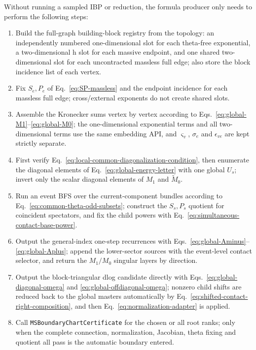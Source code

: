 \documentclass[11pt,a4paper]{article}
\begin{document}
Without running a sampled IBP or reduction, the formula producer only needs to perform the following steps:
\begin{enumerate}[label=\arabic*.]
  \item Build the full-graph building-block registry from the topology: an independently numbered one-dimensional slot for each theta-free exponential, a two-dimensional h slot for each massive endpoint, and one shared two-dimensional slot for each uncontracted massless full edge; also store the block incidence list of each vertex.
  \item Fix $S_e,P_e$ of Eq.~\eqref{eq:SP-massless} and the endpoint incidence for each massless full edge; cross/external exponents do not create shared slots.
  \item Assemble the Kronecker sums vertex by vertex according to Eqs.~\eqref{eq:global-M1}--\eqref{eq:global-M0}; the one-dimensional exponential terms and all two-dimensional terms use the same embedding API, and $\varsigma_v$, $\sigma_e$ and $\epsilon_{ve}$ are kept strictly separate.
  \item First verify Eq.~\eqref{eq:local-common-diagonalization-condition}, then enumerate the diagonal elements of Eq.~\eqref{eq:global-energy-letter} with one global $U_s$; invert only the scalar diagonal elements of $M_1$ and $\widetilde M_0$.
  \item Run an event BFS over the current-component bundles according to Eq.~\eqref{eq:common-theta-odd-subsets}; construct the $S_s,P_s$ quotient for coincident spectators, and fix the child powers with Eq.~\eqref{eq:simultaneous-contact-base-power}.
  \item Output the general-index one-step recurrences with Eqs.~\eqref{eq:global-Aminus}--\eqref{eq:global-Aplus}; append the lower-sector sources with the event-level contact selector, and return the $M_1/M_0$ singular layers by direction.
  \item Output the block-triangular dlog candidate directly with Eqs.~\eqref{eq:global-diagonal-omega} and \eqref{eq:global-offdiagonal-omega}; nonzero child shifts are reduced back to the global masters automatically by Eq.~\eqref{eq:shifted-contact-right-composition}, and then Eq.~\eqref{eq:normalization-adapter} is applied.
  \item Call \texttt{MSBoundaryChartCertificate} for the chosen or all root ranks; only when the complete connection, normalization, Jacobian, theta fixing and quotient all pass is the automatic boundary entered.
\end{enumerate}
\end{document}
